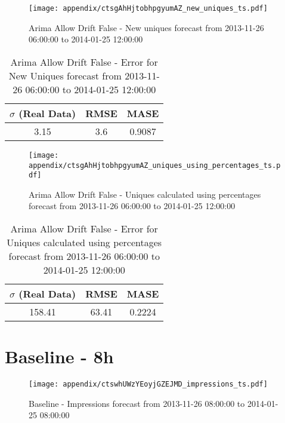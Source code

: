 \begin{figure}[H] \begin{center} \leavevmode
\texttt{[image: appendix/ctsgAhHjtobhpgyumAZ\_new\_uniques\_ts.pdf]} \caption{
Arima Allow Drift False - New uniques forecast from 2013-11-26 06:00:00 to 2014-01-25 12:00:00} \label{fig:appendix/ctsgAhHjtobhpgyumAZ_new_uniques_ts.pdf} \end{center}
\end{figure}

\begin{table}[H]
\centering
\footnotesize
\begin{tabular}{ccc}
$\sigma$ (Real Data) & RMSE & MASE   \\ \hline
3.15 & 3.6 & 0.9087 \\
\end{tabular}

\vspace{0.5cm}

\caption{
Arima Allow Drift False - Error for New Uniques forecast from 2013-11-26 06:00:00 to 2014-01-25 12:00:00}
\end{table}

\begin{figure}[H] \begin{center} \leavevmode
\texttt{[image: appendix/ctsgAhHjtobhpgyumAZ\_uniques\_using\_percentages\_ts.pdf]} \caption{
Arima Allow Drift False - Uniques calculated using percentages forecast from 2013-11-26 06:00:00 to 2014-01-25 12:00:00} \label{fig:appendix/ctsgAhHjtobhpgyumAZ_uniques_using_percentages_ts.pdf} \end{center}
\end{figure}

\begin{table}[H]
\centering
\footnotesize
\begin{tabular}{ccc}
$\sigma$ (Real Data) & RMSE & MASE   \\ \hline
158.41 & 63.41 & 0.2224 \\
\end{tabular}

\vspace{0.5cm}

\caption{
Arima Allow Drift False - Error for Uniques calculated using percentages forecast from 2013-11-26 06:00:00 to 2014-01-25 12:00:00}
\end{table}

\section{Baseline - 8h}
\begin{figure}[H] \begin{center} \leavevmode
\texttt{[image: appendix/ctswhUWzYEoyjGZEJMD\_impressions\_ts.pdf]} \caption{
Baseline - Impressions forecast from 2013-11-26 08:00:00 to 2014-01-25 08:00:00} \label{fig:appendix/ctswhUWzYEoyjGZEJMD_impressions_ts.pdf} \end{center}
\end{figure}

